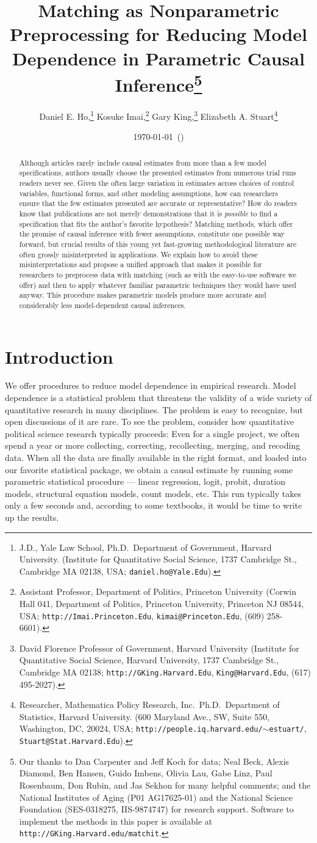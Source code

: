 \documentclass[11pt,titlepage]{article}
\title{Matching as Nonparametric Preprocessing for Reducing Model
  Dependence in Parametric Causal Inference\thanks{Our thanks to Dan
    Carpenter and Jeff Koch for data; Neal Beck, Alexis Diamond, Ben
    Hansen, Guido Imbens, Olivia Lau, Gabe Linz, Paul Rosenbaum, Don
    Rubin, and Jas Sekhon for many helpful comments; and the National
    Institutes of Aging (P01 AG17625-01) and the National Science
    Foundation (SES-0318275, IIS-9874747) for research support.
    Software to implement the methods in this paper is available at
    \texttt{http://GKing.Harvard.edu/matchit}.}}
\author{Daniel E. Ho,\thanks{J.D., Yale Law School, Ph.D.\, Department
    of Government, Harvard University. (Institute for Quantitative
    Social Science, 1737 Cambridge St., Cambridge MA 02138, USA;
    \texttt{daniel.ho@Yale.Edu}).}
  Kosuke Imai,\thanks{Assistant Professor, Department of Politics,
    Princeton University (Corwin Hall 041, Department of Politics,
    Princeton University, Princeton NJ 08544, USA;
    \texttt{http://Imai.Princeton.Edu}, \texttt{kimai@Princeton.Edu},
    (609) 258-6601).}
  Gary King,\thanks{David Florence Professor of Government, Harvard
    University (Institute for Quantitative Social Science, Harvard
    University, 1737 Cambridge St., Cambridge MA 02138;
    \texttt{http://GKing.Harvard.Edu}, \texttt{King@Harvard.Edu},
    (617) 495-2027).}
Elizabeth A. Stuart\thanks{Researcher, Mathematica Policy Research,
  Inc.\, Ph.D.\, Department of Statistics, Harvard University.
  (600 Maryland Ave., SW, Suite 550,  Washington, DC, 20024, USA;
  \texttt{http://people.iq.harvard.edu/$\sim$estuart/},
  \texttt{Stuart@Stat.Harvard.Edu}).}}
\date{\today\ (\printtime)}
\begin{document}
\maketitle
{}\baselineskip

\begin{abstract}
  Although articles rarely include causal estimates from more than a
  few model specifications, authors usually choose the presented
  estimates from numerous trial runs readers never see.  Given the
  often large variation in estimates across choices of control
  variables, functional forms, and other modeling assumptions, how can
  researchers ensure that the few estimates presented are accurate or
  representative?  How do readers know that publications are not
  merely demonstrations that it is \emph{possible} to find a
  specification that fits the author's favorite hypothesis?  Matching
  methods, which offer the promise of causal inference with fewer
  assumptions, constitute one possible way forward, but crucial
  results of this young yet fast-growing methodological literature are
  often grossly misinterpreted in applications.  We explain how to
  avoid these misinterpretations and propose a unified approach that
  makes it possible for researchers to preprocess data with matching
  (such as with the easy-to-use software we offer) and then to apply
  whatever familiar parametric techniques they would have used anyway.
  This procedure makes parametric models produce more accurate and
  considerably less model-dependent causal inferences.
\end{abstract}

\section{Introduction}

We offer procedures to reduce model dependence in empirical research.
Model dependence is a statistical problem that threatens the validity
of a wide variety of quantitative research in many disciplines.  The
problem is easy to recognize, but open discussions of it are rare.  To
see the problem, consider how quantitative political science research
typically proceeds: Even for a single project, we often spend a year
or more collecting, correcting, recollecting, merging, and recoding
data.  When all the data are finally available in the right format,
and loaded into our favorite statistical package, we obtain a causal
estimate by running some parametric statistical procedure --- linear
regression, logit, probit, duration models, structural equation
models, count models, etc.  This run typically takes only a few
seconds and, according to some textbooks, it would be time to write up
the results.
\end{document}
